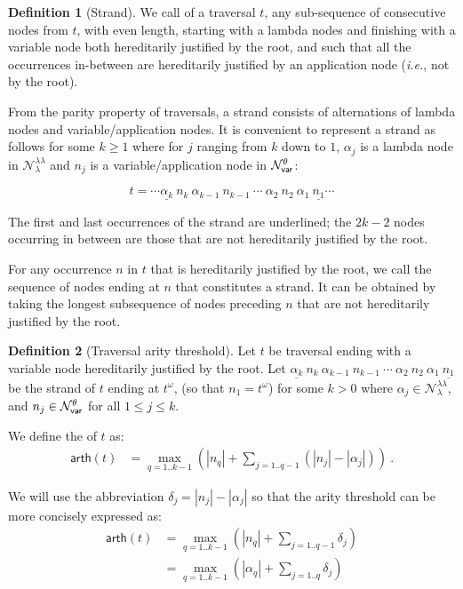 \documentclass{article}
\makeatletter
\theoremstyle{definition}
\newtheorem{definition}{Definition}[section]
\newcommand\Nodes{\mathcal{N}}%
\newcommand\NodesVar{\Nodes_{\sf var}}%
\newcommand\NodesLmd{\Nodes_\lambda}%
\newcommand{\ghostlmd}{{\lambda\!\!\lambda}}
\newcommand{\ghostvar}{\theta}
\newcommand\ImNodesVar{\NodesVar^\ghostvar}
\newcommand\ImNodesLmd{\NodesLmd^\ghostlmd}
\newcommand\arth{\textsf{arth}} %
\renewcommand\ie{{\it i.e.\@\xspace}}
\makeatother
\begin{document}
\begin{definition}[Strand]
\label{ref:strand}
We call  of a traversal $t$, any sub-sequence of consecutive nodes from $t$,
with even length, starting with a lambda nodes and finishing with a variable node both hereditarily justified by the root, and such that all the occurrences in-between are hereditarily justified by an application node (\ie, not by the root).

From the parity property of traversals, a strand consists of alternations of lambda nodes and variable/application nodes. It is convenient to represent a strand as follows for some $k\geq 1$ where for $j$ ranging from $k$ down to $1$, $\alpha_j$ is a lambda node in $\ImNodesLmd$ and $n_j$ is a variable/application node in $\ImNodesVar$:

$$ t = \cdots \underline{\alpha_k}\ n_k\ \alpha_{k-1}\ n_{k-1}\ \cdots\ \alpha_2\ n_2\ \alpha_1\ \underline{n_1} \cdots $$

The first and last occurrences of the strand are underlined; the $2k-2$ nodes occurring in between are those that are not hereditarily justified by the root.

For any occurrence $n$ in $t$ that is hereditarily justified by the root, we call  the sequence of nodes ending at $n$ that constitutes a strand. It can be obtained by taking the longest subsequence of nodes preceding $n$ that are not hereditarily justified by the root.
\end{definition}

\begin{definition}[Traversal arity threshold]
\label{dfn:arity-threshold}
Let $t$ be traversal ending with a variable node hereditarily justified by the root.
Let $\underline{\alpha_k}\ n_k\ \alpha_{k-1}\ n_{k-1}\ \cdots\ \alpha_2\ n_2\ \alpha_1\ \underline{n_1}$ be the strand of $t$ ending at $t^\omega$, (so that $n_1 = t^\omega$) for some $k>0$  where $\alpha_j \in \ImNodesLmd$, and $n_j \in \ImNodesVar$ for all $1\leq j\leq k$.

We define the  of $t$ as:
\begin{align*}
\arth(t) &= \max_{q=1..k-1} \left( |n_q| + \sum_{j=1..q-1} (|n_j| - |\alpha_j|) \right)\ .
\end{align*}
\end{definition}

We will use the abbreviation $ \delta_j = |n_j| - |\alpha_j|$
so that the arity threshold can be more concisely expressed as:
\begin{align*}
    \arth(t) &= \max_{q=1..k-1} \left( |n_q| + \sum_{j=1..q-1} \delta_j \right) \\
    &= \max_{q=1..k-1} \left( |\alpha_q| + \sum_{j=1..q} \delta_j\right)
\end{align*}
\end{document}
